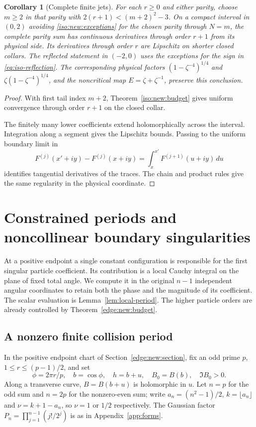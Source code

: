 \documentclass[11pt]{article}
\numberwithin{equation}{section}
\newtheorem{corollary}[theorem]{Corollary}
\theoremstyle{definition}
\begin{document}
\begin{corollary}[Complete finite jets]\label{iso:new:jets}
For each $r\ge0$ and either parity, choose $m\ge2$ in that parity
with $2(r+1)<(m+2)^2-3$. On a compact interval in $(0,2)$ avoiding
\eqref{iso:new:exceptions} for the chosen parity through $N=m$, the complete parity sum has continuous
derivatives through order $r+1$ from its physical side. Its derivatives
through order $r$ are Lipschitz on shorter closed collars. The reflected
statement in $(-2,0)$ uses the exceptions for the sign in
\eqref{eq:iso-reflection}. The corresponding physical factors
$(1-\zeta^{-4})^{1/4}$ and
$\zeta(1-\zeta^{-4})^{1/4}$, and the noncritical map
$E=\zeta+\zeta^{-1}$, preserve this conclusion.
\end{corollary}
\begin{proof}
With first tail index $m+2$, Theorem~\ref{iso:new:budget} gives
uniform convergence through order $r+1$ on the closed collar.

The finitely many lower coefficients extend holomorphically across
the interval. Integration along a segment gives the Lipschitz bounds.
Passing to the uniform boundary limit in
\[
 F^{(j)}(x'+iy)-F^{(j)}(x+iy)
   =\int_x^{x'}F^{(j+1)}(u+iy)\,du
\]
identifies tangential derivatives of the traces. The chain and product
rules give the same regularity in the physical coordinate.
\end{proof}

\section{Constrained periods and noncollinear boundary singularities}
\label{sec:period}

At a positive endpoint a single constant configuration is responsible
for the first singular particle coefficient. Its contribution is a
local Cauchy integral on the plane of fixed total angle. We compute it
in the original $n-1$ independent angular coordinates to retain both
the phase and the magnitude of its coefficient. The scalar evaluation
is Lemma~\ref{lem:local-period}. The higher particle orders are
already controlled by Theorem~\ref{edge:new:budget}.

\subsection{A nonzero finite collision period}

In the positive endpoint chart of Section~\ref{edge:new:section},
fix an odd prime $p$, $1\le r\le(p-1)/2$, and set
\[
 \phi=2\pi r/p,\quad b=\cos\phi,\quad
 h=b+u,\quad B_0=B(b),\quad \Im B_0>0.
\]
Along a transverse curve, $B=B(b+u)$ is holomorphic in $u$. Let $n=p$
for the odd sum and $n=2p$ for the nonzero-even sum; write
$a_n=(n^2-1)/2$, $k=\lfloor a_n\rfloor$ and
$\nu=k+1-a_n$, so $\nu=1$ or $1/2$ respectively. The Gaussian
factor $P_n=\prod_{j=1}^{n-1}(j!/2^j)$ is as in Appendix~\ref{app:forms}.
\end{document}
